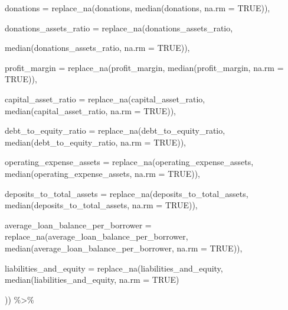 \documentclass[a4paper,nobind]{templates/ociamthesis}
\newenvironment{Shaded}{\begin{snugshade}}{\end{snugshade}}
\newcommand{\AttributeTok}[1]{\textcolor[rgb]{0.77,0.63,0.00}{#1}}
\newcommand{\ConstantTok}[1]{\textcolor[rgb]{0.00,0.00,0.00}{#1}}
\newcommand{\FunctionTok}[1]{\textcolor[rgb]{0.00,0.00,0.00}{#1}}
\newcommand{\NormalTok}[1]{#1}
\newcommand{\SpecialCharTok}[1]{\textcolor[rgb]{0.00,0.00,0.00}{#1}}
\renewenvironment{Shaded}
{
  \vspace{10pt}%
  \begin{snugshade}%
}{%
  \end{snugshade}%
  \vspace{8pt}%
}
\begin{document}
\begin{Shaded}
\begin{Highlighting}[]
         \AttributeTok{donations =} \FunctionTok{replace\_na}\NormalTok{(donations, }\FunctionTok{median}\NormalTok{(donations, }\AttributeTok{na.rm =} \ConstantTok{TRUE}\NormalTok{)),}
         
         \AttributeTok{donations\_assets\_ratio =} \FunctionTok{replace\_na}\NormalTok{(donations\_assets\_ratio, }
                                             
                                  \FunctionTok{median}\NormalTok{(donations\_assets\_ratio, }\AttributeTok{na.rm =} \ConstantTok{TRUE}\NormalTok{)), }
         
         \AttributeTok{profit\_margin =} \FunctionTok{replace\_na}\NormalTok{(profit\_margin, }\FunctionTok{median}\NormalTok{(profit\_margin, }\AttributeTok{na.rm =} \ConstantTok{TRUE}\NormalTok{)),}
         
         \AttributeTok{capital\_asset\_ratio =} \FunctionTok{replace\_na}\NormalTok{(capital\_asset\_ratio, }\FunctionTok{median}\NormalTok{(capital\_asset\_ratio, }\AttributeTok{na.rm =} \ConstantTok{TRUE}\NormalTok{)),}
         
         \AttributeTok{debt\_to\_equity\_ratio =} \FunctionTok{replace\_na}\NormalTok{(debt\_to\_equity\_ratio, }\FunctionTok{median}\NormalTok{(debt\_to\_equity\_ratio, }\AttributeTok{na.rm =} \ConstantTok{TRUE}\NormalTok{)),}
         
         \AttributeTok{operating\_expense\_assets =} \FunctionTok{replace\_na}\NormalTok{(operating\_expense\_assets, }\FunctionTok{median}\NormalTok{(operating\_expense\_assets, }\AttributeTok{na.rm =} \ConstantTok{TRUE}\NormalTok{)),}
         
         \AttributeTok{deposits\_to\_total\_assets =} \FunctionTok{replace\_na}\NormalTok{(deposits\_to\_total\_assets, }\FunctionTok{median}\NormalTok{(deposits\_to\_total\_assets, }\AttributeTok{na.rm =} \ConstantTok{TRUE}\NormalTok{)), }
         
\AttributeTok{average\_loan\_balance\_per\_borrower =} \FunctionTok{replace\_na}\NormalTok{(average\_loan\_balance\_per\_borrower, }\FunctionTok{median}\NormalTok{(average\_loan\_balance\_per\_borrower, }\AttributeTok{na.rm =} \ConstantTok{TRUE}\NormalTok{)),}
    
\AttributeTok{liabilities\_and\_equity =} \FunctionTok{replace\_na}\NormalTok{(liabilities\_and\_equity, }\FunctionTok{median}\NormalTok{(liabilities\_and\_equity, }\AttributeTok{na.rm =} \ConstantTok{TRUE}\NormalTok{)  }
         
\NormalTok{         )) }\SpecialCharTok{\%\textgreater{}\%} 
  

\end{Highlighting}
\end{Shaded}
\end{document}
